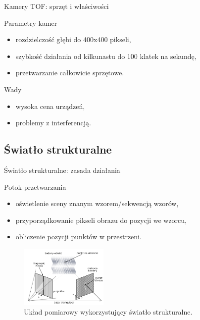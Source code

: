 \documentclass[xcolor=x11names,compress]{beamer}
\renewcommand{\(}{\begin{columns}}
\renewcommand{\)}{\end{columns}}
\newcommand{\<}[1]{\begin{column}{#1}}
\renewcommand{\>}{\end{column}}
\begin{document}
\begin{frame}{Kamery TOF: sprzęt i właściwości}

	\alert{Parametry kamer}
	\begin{itemize}
	\item rozdzielczość głębi do 400x400 pikseli,
	\item szybkość działania od kilkunastu do 100 klatek na sekundę,
	\item przetwarzanie całkowicie sprzętowe.
	\end{itemize}

	\vspace{.7cm}

	\alert{Wady}
	\begin{itemize}
	\item wysoka cena urządzeń,
	\item problemy z interferencją.
	\end{itemize}

\end{frame}

\subsection{\vspace{2cm}Światło strukturalne}

\begin{frame}{Światło strukturalne: zasada działania}

    \vspace{1cm}
    \alert{Potok przetwarzania}
    \begin{itemize}[<+->]
    \item oświetlenie sceny znanym wzorem/sekwencją wzorów,
    \item przyporządkowanie pikseli obrazu do pozycji we wzorcu,
    \item obliczenie pozycji punktów w przestrzeni.
    \end{itemize}

    \begin{figure}[h!]
    \centering
    \includegraphics[height=3cm]{../Common/img/struct}
    \caption{Układ pomiarowy wykorzystujący światło strukturalne.}
    \label{fig:struct}
    \end{figure}

\end{frame}
\end{document}
